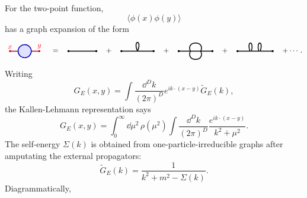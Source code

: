 For the two-point function,
\[
  \langle\phi(x)\phi(y)\rangle
\]
has a graph expansion of the form
\[
\begin{tikzpicture}[baseline=-0.45ex, scale=0.72]
  \fill[red] (-1,0) circle (2pt) node[above] {$x$};
  \fill[red] (1,0) circle (2pt) node[above] {$y$};
  \draw[purple!80!black, very thick] (-1,0)--(-0.45,0);
  \fill[blue!12, draw=blue!70!black, very thick] (0,0) circle (0.45);
  \draw[purple!80!black, very thick] (0.45,0)--(1,0);
\end{tikzpicture}
\quad=\quad
\begin{tikzpicture}[baseline=-0.45ex, scale=0.72]
  \fill ( -0.95,0) circle (2pt);
  \fill ( 0.95,0) circle (2pt);
  \draw[very thick] (-0.95,0)--(0.95,0);
\end{tikzpicture}
\quad+\quad
\begin{tikzpicture}[baseline=-0.45ex, scale=0.72]
  \fill (-1.1,0) circle (2pt);
  \fill (1.1,0) circle (2pt);
  \draw[very thick] (-1.1,0)--(1.1,0);
  \draw[very thick] (0,0) .. controls (-0.35,0.8) and (0.35,0.8) .. (0,0);
\end{tikzpicture}
\quad+\quad
\begin{tikzpicture}[baseline=-0.45ex, scale=0.72]
  \fill (-1.15,0) circle (2pt);
  \fill (1.15,0) circle (2pt);
  \draw[very thick] (-1.15,0)--(1.15,0);
  \draw[very thick] (-0.35,0) .. controls (-0.7,0.75) and (0.7,0.75) .. (0.35,0);
  \draw[very thick] (-0.35,0) .. controls (-0.7,-0.75) and (0.7,-0.75) .. (0.35,0);
\end{tikzpicture}
\quad+\quad
\begin{tikzpicture}[baseline=-0.45ex, scale=0.72]
  \fill (-1.2,0) circle (2pt);
  \fill (1.2,0) circle (2pt);
  \draw[very thick] (-1.2,0)--(1.2,0);
  \draw[very thick] (-0.35,0) .. controls (-0.6,0.75) and (-0.05,0.75) .. (-0.25,0);
  \draw[very thick] (0.35,0) .. controls (0.6,0.75) and (0.05,0.75) .. (0.25,0);
\end{tikzpicture}
\quad+\cdots .
\]
Writing
\[
  G_E(x,y)
  =
  \int\frac{\dd^D k}{(2\pi)^D}
  e^{ik\cdot(x-y)}\widetilde G_E(k),
\]
the Kallen-Lehmann representation says
\[
  G_E(x,y)
  =
  \int_0^\infty\dd\mu^2\,\rho(\mu^2)
  \int\frac{\dd^D k}{(2\pi)^D}
  \frac{e^{ik\cdot(x-y)}}{k^2+\mu^2}.
\]
The self-energy \(\Sigma(k)\) is obtained from one-particle-irreducible
graphs after amputating the external propagators:
\[
  \widetilde G_E(k)
  =
  \frac{1}{k^2+m^2-\Sigma(k)}.
\]
Diagrammatically,
